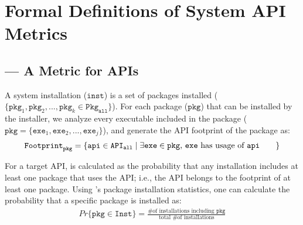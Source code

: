 \chapter{Formal Definitions of System API Metrics}
\label{chap:defs}


\section{\UsageMetric{} --- A Metric for APIs}
\label{sec:defs:usagemetric}

\vspace{0.1in}
{\noindent
{}}
\vspace{0.1in}

A system installation ($\mathtt{inst}$)
is a set of packages installed ($\{\mathtt{pkg}_1, \mathtt{pkg}_2, ..., \mathtt{pkg}_k \in \mathtt{Pkg}_\mathtt{all}\}$).
For each package ($\mathtt{pkg}$)  that can be installed by the installer,
we analyze every executable included in the package 
($\mathtt{pkg} = \{\mathtt{exe}_1, \mathtt{exe}_2, ..., \mathtt{exe}_j\}$), and
generate the API footprint of the package as:
\begin{align*}
{\mathtt{Footprint}}_{\mathtt{pkg}} = \{\mathtt{api} \in {\mathtt{API}}_{\mathtt{all}} \mid \text{\parbox{2.3in}{$\exists \mathtt{exe} \in \mathtt{pkg}$,
$\mathtt{exe}$ has usage of $\mathtt{api}$}}\}
\end{align*}

\noindent
For a target API, \usagemetric{} is calculated as the probability
that any installation includes
at least one package that uses the API;
i.e.,
the API belongs to the footprint of at least one package.
Using \osdist{}'s package installation statistics, one can calculate the
probability that a specific package is installed as:
\begin{align*}
Pr\{\mathtt{pkg} \in \mathtt{Inst}\} = \frac{\text{\# of installations including $\mathtt{pkg}$}}{\text{total \# of installations}}
\end{align*}

